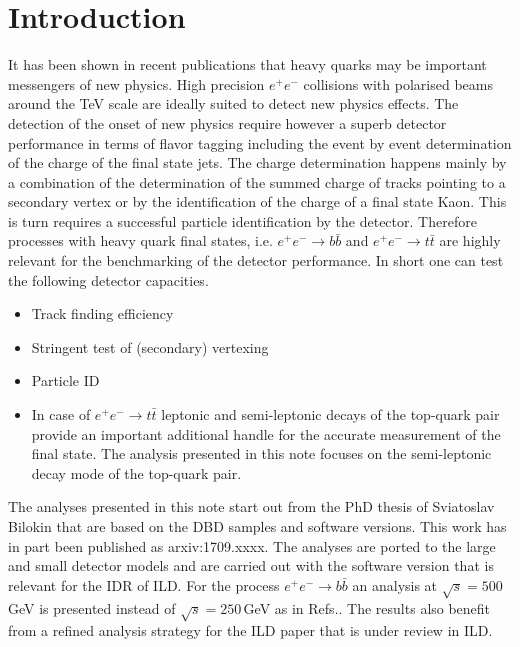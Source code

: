 \documentclass[preprint]{elsarticle}
\begin{document}
\tableofcontents



\section{Introduction}

It has been shown in recent publications that heavy quarks may be important messengers of new physics. High precision $e^+e^-$ collisions with polarised beams around the TeV scale are ideally suited to detect new physics effects. The detection of the onset of new physics require however a superb detector performance in terms of flavor tagging including the event by event determination of the charge of the final state jets. The charge determination happens mainly by a combination of the determination of the summed charge of tracks pointing to a secondary vertex or by the identification of the charge of a final state Kaon. This is turn requires a successful particle identification by the detector. 
Therefore processes with heavy quark final states, i.e. $e^+e^-\rightarrow b\bar{b}$  and $e^+e^-\rightarrow t\bar{t}$ are highly relevant for the benchmarking of the detector performance. In short one can test the following detector capacities. 

\begin{itemize}
\item Track finding efficiency 
\item Stringent test of (secondary) vertexing
\item Particle ID
\item In case of $e^+e^-\rightarrow t\bar{t}$  leptonic and semi-leptonic decays of the top-quark pair provide an important additional handle for the accurate measurement of the final state. The analysis presented in this note focuses on the semi-leptonic decay mode of the top-quark pair. 
\end{itemize}
The analyses presented in this note start out from the PhD thesis of Sviatoslav Bilokin that are based on the DBD samples and software versions. This work has in part been published as arxiv:1709.xxxx. The analyses are ported to the large and small detector models and are carried out with the software version that is relevant for the IDR of ILD. For the process $e^+e^-\rightarrow b\bar{b}$ an analysis at $\sqrt{s}=500$\,GeV is presented instead of $\sqrt{s}=250$\,GeV as in Refs.. The results also benefit from a refined analysis strategy for the ILD paper that is under review in ILD. 
\end{document}
